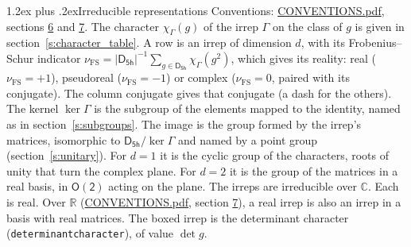 \documentclass[10pt,a4paper]{article}
\makeatletter
\renewcommand\section{\@startsection{section}{1}{\z@}{-3ex plus -1ex minus -.2ex}%
  {1.2ex plus .2ex}{\normalfont\large\sffamily\bfseries\color{parttitle}}}
\numberwithin{equation}{section}
\newcommand{\grp}[1]{\mathsf{#1}}
\newcommand{\irchar}[1]{\chi_{#1}}
\newcommand{\fsind}{\nu_{\mathrm{FS}}}
\makeatother
\begin{document}
\section{Irreducible representations}\label{s:irreps}
Conventions: \href{../../CONVENTIONS.pdf}{CONVENTIONS.pdf}, sections \href{../../CONVENTIONS.pdf\#conv.6}{6} and \href{../../CONVENTIONS.pdf\#conv.7}{7}.
\leavevmode\label{n:function.character}\label{n:irrep.Gamma}The character $\irchar{\Gamma}(g)$ of the irrep $\Gamma$ on the class of $g$ is given in section~\ref{s:character_table}.
\leavevmode\label{n:index.dimension}\label{n:index.frobenius}\label{n:head.irrep}\label{n:head.reality}A row is an irrep of dimension $d$, with its Frobenius--Schur indicator $\fsind = |\grp{D_{5h}}|^{-1}\allowbreak\sum_{g\in\grp{D_{5h}}}\irchar{\Gamma}(g^2)$, which gives its reality: real ($\fsind = +1$), pseudoreal ($\fsind = -1$) or complex ($\fsind = 0$, paired with its conjugate). \label{n:head.conjugate}The column conjugate gives that conjugate (a dash for the others). \label{n:head.kernel}The kernel $\ker\Gamma$ is the subgroup of the elements mapped to the identity, named as in section~\ref{s:subgroups}. \label{n:head.image}The image is the group formed by the irrep's matrices, isomorphic to $\grp{D_{5h}}/\ker\Gamma$ and named by a point group (section~\ref{s:unitary}). For $d = 1$ it is the cyclic group of the characters, roots of unity that turn the complex plane. For $d = 2$ it is the group of the matrices in a real basis, in $\grp{O(2)}$ acting on the plane. The irreps are irreducible over $\mathbb{C}$. Each is real. Over $\mathbb{R}$ (\href{../../CONVENTIONS.pdf}{CONVENTIONS.pdf}, section \href{../../CONVENTIONS.pdf\#conv.7}{7}), a real irrep is also an irrep in a basis with real matrices. \label{n:mark.determinant}The boxed irrep is the determinant character (\texttt{determinantcharacter}), of value $\det g$.
\setlength{\emergencystretch}{2em}\par\setlength{\emergencystretch}{0pt}
\end{document}

